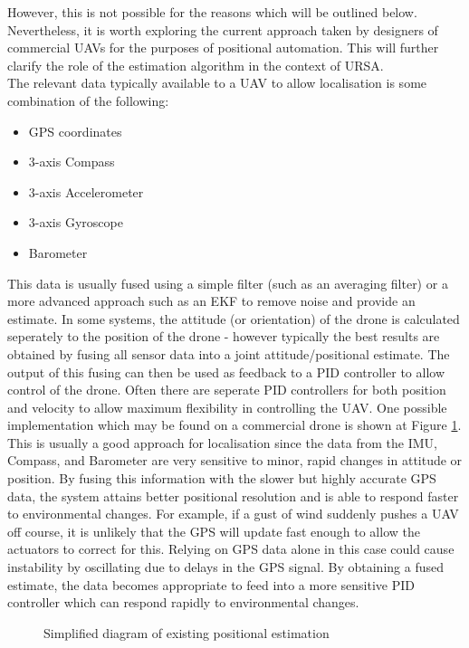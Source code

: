 \documentclass[capstone_report.tex]{subfiles}
\begin{document}
However, this is not possible for the reasons which will be outlined below. Nevertheless, it is worth exploring the current approach taken by designers of commercial UAVs for the purposes of positional automation. This will further clarify the role of the estimation algorithm in the context of URSA.\\

The relevant data typically available to a UAV to allow localisation is some combination of the following:
\begin{itemize}
	\item GPS coordinates
	\item 3-axis Compass
	\item 3-axis Accelerometer
	\item 3-axis Gyroscope
	\item Barometer
\end{itemize}

This data is usually fused using a simple filter (such as an averaging filter) or a more advanced approach such as an EKF to remove noise and provide an estimate. In some systems, the attitude (or orientation) of the drone is calculated seperately to the position of the drone - however typically the best results are obtained by fusing all sensor data into a joint attitude/positional estimate. The output of this fusing can then be used as feedback to a PID controller to allow control of the drone. Often there are seperate PID controllers for both position and velocity to allow maximum flexibility in controlling the UAV. One possible implementation which may be found on a commercial drone is shown at Figure \ref{fig:estAlg2}. \\

This is usually a good approach for localisation since the data from the IMU, Compass, and Barometer are very sensitive to minor, rapid changes in attitude or position. By fusing this information with the slower but highly accurate GPS data, the system attains better positional resolution and is able to respond faster to environmental changes. For example, if a gust of wind suddenly pushes a UAV off course, it is unlikely that the GPS will update fast enough to allow the actuators to correct for this. Relying on GPS data alone in this case could cause instability by oscillating due to delays in the GPS signal. By obtaining a fused estimate, the data becomes appropriate to feed into a more sensitive PID controller which can respond rapidly to environmental changes.

\begin{figure}[H]
	
	\caption{Simplified diagram of existing positional estimation\label{fig:estAlg2}}
\end{figure}
\end{document}
